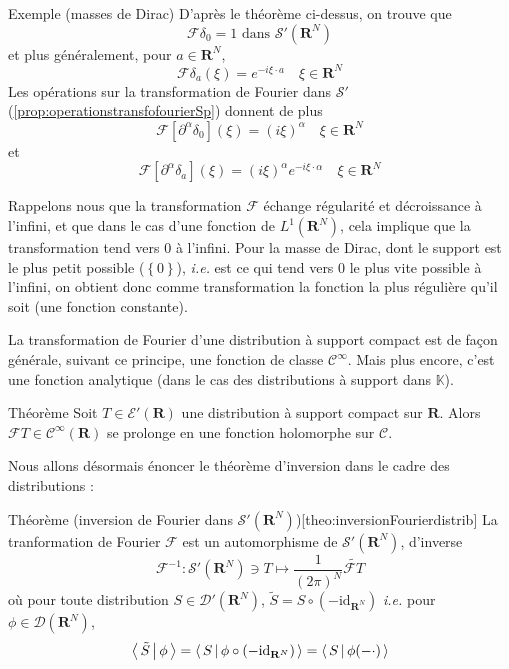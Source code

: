         \begin{demo}{Exemple (masses de Dirac)}
            D’après le théorème ci-dessus, on trouve que 
            \[ \mathcal{F}\delta_0 = 1 \text{ dans } \mathcal{S}'(\mathbf{R}^N) \]   
            et plus généralement, pour $a \in \mathbf{R}^N$, 
            \[ \mathcal{F}\delta_a(\xi) = e^{-i \xi \cdot a} \quad \xi \in \mathbf{R}^N \]
            Les opérations sur la transformation de Fourier dans $\mathcal{S}'$ (\ref{prop:operationstransfofourierSp}) donnent de plus
            \[ \mathcal{F}[\partial^{\alpha}\delta_0](\xi) = (i \xi)^{\alpha} \quad \xi \in \mathbf{R}^N \]
            et 
            \[ \mathcal{F}[\partial^{\alpha}\delta_a](\xi) = (i \xi)^{\alpha} e^{-i \xi \cdot \alpha} \quad \xi \in \mathbf{R}^N \]
        \end{demo}

        Rappelons nous que la transformation $\mathcal{F}$ échange régularité et décroissance à l’infini, et que dans le cas d’une fonction de $L^1(\mathbf{R}^N)$, cela implique que la transformation tend vers 0 à l’infini. Pour la masse de Dirac, dont le support est le plus petit possible ($\left\{0\right\}$), \textit{i.e.} est ce qui tend vers 0 le plus vite possible à l’infini, on obtient donc comme transformation la fonction la plus régulière qu’il soit (une fonction constante).
        
        La transformation de Fourier d’une distribution à support compact est de façon générale, suivant ce principe, une fonction de classe $\mathcal{C}^{\infty}$. Mais plus encore, c’est une fonction analytique (dans le cas des distributions à support dans $\mathbb{K}$).

        \begin{omed}{Théorème}
            Soit $T \in \mathcal{E}'(\mathbf{R})$ une distribution à support compact sur $\mathbf{R}$. Alors $\mathcal{F}T \in \mathcal{C}^{\infty}(\mathbf{R})$ se prolonge en une fonction holomorphe sur $\mathcal{C}$.
        \end{omed}

        Nous allons désormais énoncer le théorème d’inversion dans le cadre des distributions :

        \begin{omed}{Théorème (inversion de Fourier dans $\mathcal{S}'(\mathbf{R}^N)$)}[theo:inversionFourierdistrib]
            La tranformation de Fourier $\mathcal{F}$ est un automorphisme de $\mathcal{S}'(\mathbf{R}^N)$, d’inverse 
            \[ \mathcal{F}^{-1} : \mathcal{S}'(\mathbf{R}^N) \ni T \longmapsto \frac{1}{(2\pi)^N} \widetilde{\mathcal{F}T} \]
            où pour toute distribution $S \in \mathcal{D}'(\mathbf{R}^N)$, $\tilde{S} = S \circ (-\text{id}_{\mathbf{R}^N})$ \textit{i.e.} pour $\phi \in \mathcal{D}(\mathbf{R}^N)$, 
            \[ \left< \, \tilde{S} \, \middle| \, \phi \, \right> = \left< \, S \, \middle| \, \phi \circ (-\text{id}_{\mathbf{R}^N}) \, \right> = \left< \, S \, \middle| \, \phi(-\cdot) \, \right> \]
        \end{omed}

